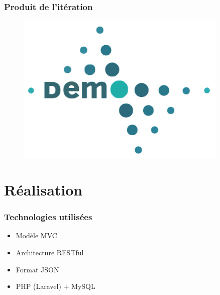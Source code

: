 \documentclass{beamer}
\begin{document}
\begin{frame}
    \frametitle{Produit de l'itération}
    \begin{figure}
        \includegraphics[width=0.9\textwidth]{./figures/demo}
    \end{figure}
\end{frame}

\section{Réalisation}

\begin{frame}
    \frametitle{Technologies utilisées}
    \begin{itemize}
        \item Modèle MVC
        \item Architecture RESTful
        \item Format JSON
        \item PHP (Laravel) + MySQL
    \end{itemize}
\end{frame}
\end{document}

